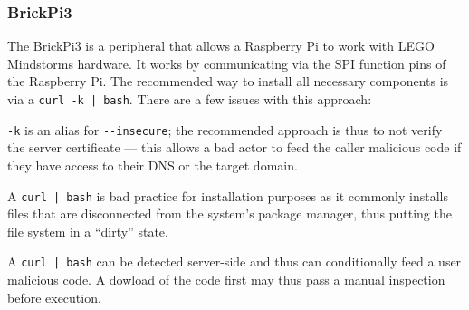 
\subsubsection{BrickPi3} \label{brickpi 3}
The BrickPi3 is a peripheral that allows a Raspberry Pi to work with LEGO Mindstorms hardware.
It works by communicating via the SPI function pins of the Raspberry Pi.
The recommended way to install all necessary components is via a \texttt{curl -k | bash}.
There are a few issues with this approach:
\begin{inline-enum}
\item \verb|-k| is an alias for \verb|--insecure|;
  the recommended approach is thus to not verify the server certificate ---
  this allows a bad actor to feed the caller malicious code if they have access to their DNS or the target domain.
\item A \texttt{curl | bash} is bad practice for installation purposes as it commonly installs files that are disconnected from the system's package manager,
  thus putting the file system in a ``dirty'' state.
\item A \texttt{curl | bash} can be detected server-side and thus can conditionally feed a user malicious code.
  A dowload of the code first may thus pass a manual inspection before execution. \parencite{curl-bash}
\end{inline-enum}

